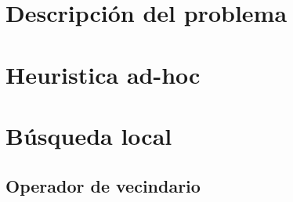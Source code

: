 \section{Descripción del problema}

\section{Heuristica ad-hoc}

\section{Búsqueda local}

\subsection{Operador de vecindario}
